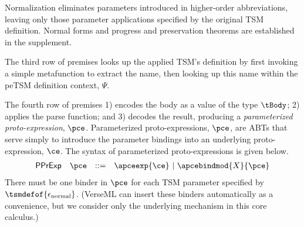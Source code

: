\documentclass[acmlarge,review,anonymous]{acmart}\settopmatter{printfolios=true}
\begin{document}
Normalization eliminates parameters introduced in higher-order abbreviations, leaving only those parameter applications specified by the original TSM definition. Normal forms and progress and preservation theorems are established in the supplement.

The third row of premises looks up the applied TSM's definition by first invoking a simple metafunction to extract the name, then looking up this name within the peTSM definition context, $\Psi$.


The fourth row of premises 1) encodes the body as a value of the type $\tBody$; 2) applies the parse function; and 3) decodes the result, producing a \emph{parameterized proto-expression}, $\pce$. Parameterized proto-expressions, $\pce$, are ABTs that serve simply to introduce the parameter bindings into an underlying proto-expression, $\ce$. The syntax of parameterized proto-expressions is given below.
\[\begin{array}{llcl}
\mathsf{PPrExp} & \pce & ::= & \apceexp{\ce} ~\vert~ \apcebindmod{X}{\pce}
\end{array}\]
There must be one binder in $\pce$ for each TSM parameter specified by $\tsmdefof{\epsilon_\text{normal}}$. (VerseML can insert these binders automatically as a convenience, but we consider only the underlying mechanism in this core calculus.) 
\end{document}
